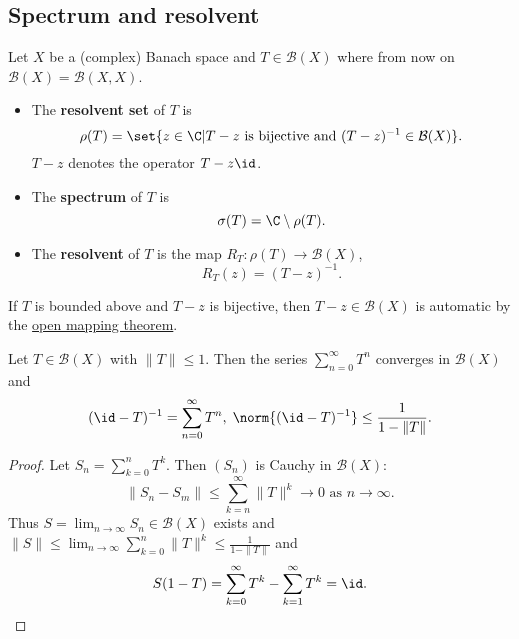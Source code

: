 \documentclass{article}
\begin{document}
\subsection{Spectrum and resolvent}
\begin{defi}
    Let $X$ be a (complex) Banach space and $T \in \mathcal{B}(X)$ where from now on $\mathcal{B}(X) = \mathcal{B}(X, X)$.
    \begin{itemize}
        \item The \textbf{resolvent set} of $T$ is
            \begin{equation*}
                \rho (T) = \set{z \in \C | T - z \text{ is bijective and } (T-z)^{-1} \in \mathcal{B}(X)}.
            \end{equation*}
            $T - z$ denotes the operator $T - z \id$.
        \item The \textbf{spectrum} of $T$ is
            \begin{equation*}
                \sigma(T) = \C \setminus \rho(T).
            \end{equation*}
        \item The \textbf{resolvent} of $T$ is the map $R_T : \rho(T) \to \mathcal{B}(X)$,
            \begin{equation*}
                R_T(z) = (T-z)^{-1}.
            \end{equation*}
    \end{itemize}
\end{defi}

\begin{remark}
    If $T$ is bounded above and $T-z$ is bijective, then $T-z \in \mathcal{B}(X)$ is automatic by the \hyperlink{thm:omt}{open mapping theorem}.
\end{remark}

\begin{fact}
    Let $T \in \mathcal{B}(X)$ with $\|T\| \leq 1$. Then the series $\sum_{n=0}^\infty T^n$ converges in $\mathcal{B}(X)$ and
    \begin{equation*}
        (\id -T)^{-1} = \sum_{n=0}^\infty T^n, \; \norm{(\id - T)^{-1}} \leq \frac{1}{1 - \|T\|}.
    \end{equation*}
\end{fact}

\begin{proof}
    Let $S_n = \sum_{k=0}^n T^k$. Then $(S_n)$ is Cauchy in $\mathcal{B}(X)$:
    \begin{equation*}
        \|S_n - S_m\| \leq \sum_{k=n}^\infty \|T\|^k \to 0 \text{ as } n \to \infty.
    \end{equation*}
    Thus $S = \lim_{n \to \infty} S_n \in \mathcal{B}(X)$ exists and $\|S\| \leq \lim_{n \to \infty} \sum_{k=0}^n \|T\|^k \leq \frac{1}{1 - \|T\|}$ and
    \begin{equation*}
        S(1-T) = \sum_{k=0}^\infty T^k - \sum_{k=1}^\infty T^k = \id.
    \end{equation*}
\end{proof}
\end{document}
